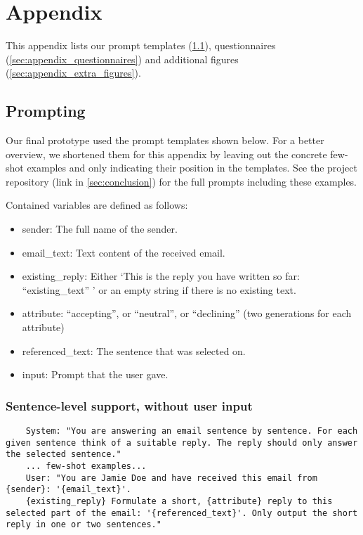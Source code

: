 \section{Appendix}

This appendix lists our prompt templates (\cref{sec:appendix_prompts}), questionnaires (\cref{sec:appendix_questionnaires}) and additional figures (\cref{sec:appendix_extra_figures}).

\subsection{Prompting}\label{sec:appendix_prompts}
Our final prototype used the prompt templates shown below. For a better overview, we shortened them for this appendix by leaving out the concrete few-shot examples and only indicating their position in the templates. See the project repository (link in \cref{sec:conclusion}) for the full prompts including these examples.

Contained variables are defined as follows:

\begin{itemize}
    \item sender: The full name of the sender.
    \item email\_text: Text content of the received email.
    \item existing\_reply: Either `This is the reply you have written so far: ``{existing\_text}'' ' or an empty string if there is no existing text.
    \item attribute: ``accepting'', or ``neutral'', or ``declining'' (two generations for each attribute)
    \item referenced\_text: The sentence that was selected on.
    \item input: Prompt that the user gave.
\end{itemize}

\subsubsection{Sentence-level support, without user input}\label{sec:appendix_sentence_without_input_prompt} %
\begin{lstlisting}
    System: "You are answering an email sentence by sentence. For each given sentence think of a suitable reply. The reply should only answer the selected sentence."
    ... few-shot examples...
    User: "You are Jamie Doe and have received this email from {sender}: '{email_text}'.
    {existing_reply} Formulate a short, {attribute} reply to this selected part of the email: '{referenced_text}'. Only output the short reply in one or two sentences."
\end{lstlisting}

